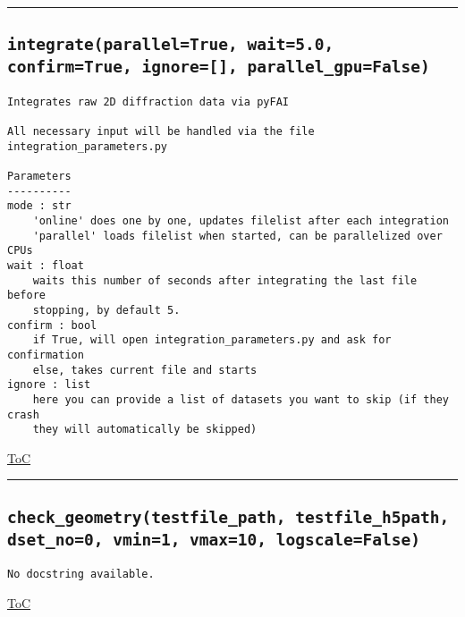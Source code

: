 \documentclass{article}
\begin{document}


\vspace{5mm}

\hrule

\subsection*{\texttt{integrate(parallel=True, wait=5.0, confirm=True, ignore=[], parallel\_gpu=False)}}
\label{fun:integrate}

\begin{lstlisting}[language=docstring]
Integrates raw 2D diffraction data via pyFAI

All necessary input will be handled via the file integration_parameters.py

Parameters
----------
mode : str
    'online' does one by one, updates filelist after each integration
    'parallel' loads filelist when started, can be parallelized over CPUs
wait : float
    waits this number of seconds after integrating the last file before
    stopping, by default 5.
confirm : bool
    if True, will open integration_parameters.py and ask for confirmation
    else, takes current file and starts
ignore : list
    here you can provide a list of datasets you want to skip (if they crash
    they will automatically be skipped)
\end{lstlisting}

\begin{flushright}

\hyperref[toc]{ToC}

\end{flushright}



\vspace{5mm}

\hrule

\subsection*{\texttt{check\_geometry(testfile\_path, testfile\_h5path, dset\_no=0, vmin=1, vmax=10, logscale=False)}}
\label{fun:checkgeometry}

\begin{lstlisting}[language=docstring]
No docstring available.
\end{lstlisting}

\begin{flushright}

\hyperref[toc]{ToC}

\end{flushright}
\end{document}
